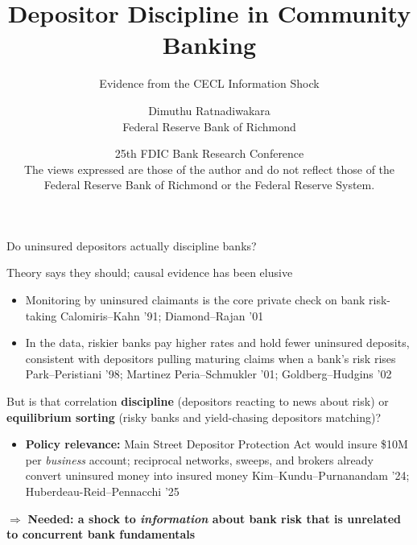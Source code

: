 \documentclass[aspectratio=169,10pt]{beamer}
\title{Depositor Discipline in Community Banking}
\subtitle{Evidence from the CECL Information Shock}
\author{Dimuthu Ratnadiwakara\\{\small Federal Reserve Bank of Richmond}}
\date{{\small 25th FDIC Bank Research Conference}\\[2mm]
  {\tiny The views expressed are those of the author and do not reflect those
  of the Federal Reserve Bank of Richmond or the Federal Reserve System.}}
\newcommand{\spec}[1]{{\vspace{-2mm}\textcolor{pgray}{\footnotesize #1}\par\vspace{1mm}}}
\newcommand{\takeaway}[1]{%
  \vfill
  {\centering\colorbox{pblue!8}{\parbox{0.94\textwidth}{\centering
    \textcolor{pblue}{$\Rightarrow$ \textbf{#1}}}}\par}}
\newcommand{\gcite}[1]{{\scriptsize\textcolor{pgray}{#1}}}
\begin{document}
\maketitle

\begin{frame}{Do uninsured depositors actually discipline banks?}
  \spec{Theory says they should; causal evidence has been elusive}
  \begin{itemize}
    \item<1-> Monitoring by uninsured claimants is the core private check on bank
      risk-taking \gcite{Calomiris--Kahn '91; Diamond--Rajan '01}
    \item<1-> In the data, riskier banks pay higher rates and hold fewer
      uninsured deposits, consistent with depositors pulling maturing claims
      when a bank's risk rises
      \gcite{Park--Peristiani '98; Martinez Peria--Schmukler '01;
      Goldberg--Hudgins '02}
  \end{itemize}
  \vspace{-1mm}
  {\centering\colorbox{pgold!18}{\parbox{0.94\textwidth}{\centering
    But is that correlation \textbf{discipline} (depositors reacting to news
    about risk) or \textbf{equilibrium sorting} (risky banks and yield-chasing
    depositors matching)?}}\par}
  \vspace{-1mm}
  \begin{itemize}
    \item<1-> \textbf{Policy relevance:} Main Street Depositor Protection
      Act would insure \$10M per \emph{business} account; reciprocal networks,
      sweeps, and brokers already convert uninsured money into insured money
      \gcite{Kim--Kundu--Purnanandam '24; Huberdeau-Reid--Pennacchi '25}
  \end{itemize}
  \takeaway{Needed: a shock to \emph{information} about bank risk that is
    unrelated to concurrent bank fundamentals}
\end{frame}
\end{document}
